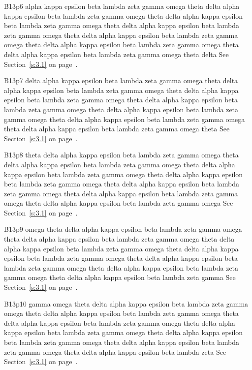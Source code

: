 B13p6 alpha kappa epsilon beta lambda zeta gamma omega theta delta alpha kappa epsilon beta lambda zeta gamma omega theta delta alpha kappa epsilon beta lambda zeta gamma omega theta delta alpha kappa epsilon beta lambda zeta gamma omega theta delta alpha kappa epsilon beta lambda zeta gamma omega theta delta alpha kappa epsilon beta lambda zeta gamma omega theta delta alpha kappa epsilon beta lambda zeta gamma omega theta delta See Section~\ref{s:3.1} on page~\pageref{s:3.1}.

B13p7 delta alpha kappa epsilon beta lambda zeta gamma omega theta delta alpha kappa epsilon beta lambda zeta gamma omega theta delta alpha kappa epsilon beta lambda zeta gamma omega theta delta alpha kappa epsilon beta lambda zeta gamma omega theta delta alpha kappa epsilon beta lambda zeta gamma omega theta delta alpha kappa epsilon beta lambda zeta gamma omega theta delta alpha kappa epsilon beta lambda zeta gamma omega theta See Section~\ref{s:3.1} on page~\pageref{s:3.1}.

B13p8 theta delta alpha kappa epsilon beta lambda zeta gamma omega theta delta alpha kappa epsilon beta lambda zeta gamma omega theta delta alpha kappa epsilon beta lambda zeta gamma omega theta delta alpha kappa epsilon beta lambda zeta gamma omega theta delta alpha kappa epsilon beta lambda zeta gamma omega theta delta alpha kappa epsilon beta lambda zeta gamma omega theta delta alpha kappa epsilon beta lambda zeta gamma omega See Section~\ref{s:3.1} on page~\pageref{s:3.1}.

B13p9 omega theta delta alpha kappa epsilon beta lambda zeta gamma omega theta delta alpha kappa epsilon beta lambda zeta gamma omega theta delta alpha kappa epsilon beta lambda zeta gamma omega theta delta alpha kappa epsilon beta lambda zeta gamma omega theta delta alpha kappa epsilon beta lambda zeta gamma omega theta delta alpha kappa epsilon beta lambda zeta gamma omega theta delta alpha kappa epsilon beta lambda zeta gamma See Section~\ref{s:3.1} on page~\pageref{s:3.1}.

B13p10 gamma omega theta delta alpha kappa epsilon beta lambda zeta gamma omega theta delta alpha kappa epsilon beta lambda zeta gamma omega theta delta alpha kappa epsilon beta lambda zeta gamma omega theta delta alpha kappa epsilon beta lambda zeta gamma omega theta delta alpha kappa epsilon beta lambda zeta gamma omega theta delta alpha kappa epsilon beta lambda zeta gamma omega theta delta alpha kappa epsilon beta lambda zeta See Section~\ref{s:3.1} on page~\pageref{s:3.1}.

